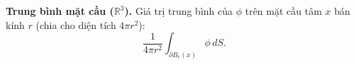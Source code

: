 \textbf{Trung bình mặt cầu ($\mathbb{R}^3$).}
Giá trị trung bình của $\phi$ trên mặt cầu tâm $x$ bán kính $r$ (chia cho diện tích $4\pi r^2$):
$$\frac{1}{4\pi r^2}\int_{\partial B_r(x)} \phi\,dS .$$
